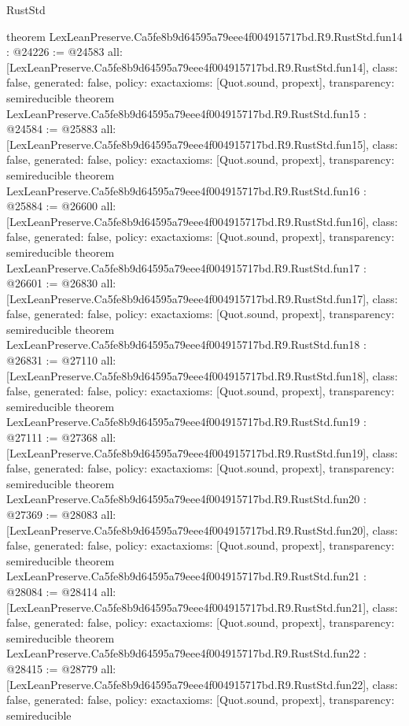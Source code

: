 \begin{lexlean}{RustStd}
\begin{coremodule}
{}
theorem LexLeanPreserve.Ca5fe8b9d64595a79eee4f004915717bd.R9.RustStd.fun14 : @24226 := @24583 {
  all: [LexLeanPreserve.Ca5fe8b9d64595a79eee4f004915717bd.R9.RustStd.fun14],
  class: false,
  generated: false,
  policy: exact{axioms: [Quot.sound, propext]},
  transparency: semireducible
}
theorem LexLeanPreserve.Ca5fe8b9d64595a79eee4f004915717bd.R9.RustStd.fun15 : @24584 := @25883 {
  all: [LexLeanPreserve.Ca5fe8b9d64595a79eee4f004915717bd.R9.RustStd.fun15],
  class: false,
  generated: false,
  policy: exact{axioms: [Quot.sound, propext]},
  transparency: semireducible
}
theorem LexLeanPreserve.Ca5fe8b9d64595a79eee4f004915717bd.R9.RustStd.fun16 : @25884 := @26600 {
  all: [LexLeanPreserve.Ca5fe8b9d64595a79eee4f004915717bd.R9.RustStd.fun16],
  class: false,
  generated: false,
  policy: exact{axioms: [Quot.sound, propext]},
  transparency: semireducible
}
theorem LexLeanPreserve.Ca5fe8b9d64595a79eee4f004915717bd.R9.RustStd.fun17 : @26601 := @26830 {
  all: [LexLeanPreserve.Ca5fe8b9d64595a79eee4f004915717bd.R9.RustStd.fun17],
  class: false,
  generated: false,
  policy: exact{axioms: [Quot.sound, propext]},
  transparency: semireducible
}
theorem LexLeanPreserve.Ca5fe8b9d64595a79eee4f004915717bd.R9.RustStd.fun18 : @26831 := @27110 {
  all: [LexLeanPreserve.Ca5fe8b9d64595a79eee4f004915717bd.R9.RustStd.fun18],
  class: false,
  generated: false,
  policy: exact{axioms: [Quot.sound, propext]},
  transparency: semireducible
}
theorem LexLeanPreserve.Ca5fe8b9d64595a79eee4f004915717bd.R9.RustStd.fun19 : @27111 := @27368 {
  all: [LexLeanPreserve.Ca5fe8b9d64595a79eee4f004915717bd.R9.RustStd.fun19],
  class: false,
  generated: false,
  policy: exact{axioms: [Quot.sound, propext]},
  transparency: semireducible
}
theorem LexLeanPreserve.Ca5fe8b9d64595a79eee4f004915717bd.R9.RustStd.fun20 : @27369 := @28083 {
  all: [LexLeanPreserve.Ca5fe8b9d64595a79eee4f004915717bd.R9.RustStd.fun20],
  class: false,
  generated: false,
  policy: exact{axioms: [Quot.sound, propext]},
  transparency: semireducible
}
theorem LexLeanPreserve.Ca5fe8b9d64595a79eee4f004915717bd.R9.RustStd.fun21 : @28084 := @28414 {
  all: [LexLeanPreserve.Ca5fe8b9d64595a79eee4f004915717bd.R9.RustStd.fun21],
  class: false,
  generated: false,
  policy: exact{axioms: [Quot.sound, propext]},
  transparency: semireducible
}
theorem LexLeanPreserve.Ca5fe8b9d64595a79eee4f004915717bd.R9.RustStd.fun22 : @28415 := @28779 {
  all: [LexLeanPreserve.Ca5fe8b9d64595a79eee4f004915717bd.R9.RustStd.fun22],
  class: false,
  generated: false,
  policy: exact{axioms: [Quot.sound, propext]},
  transparency: semireducible
}
\end{coremodule}
\end{lexlean}

